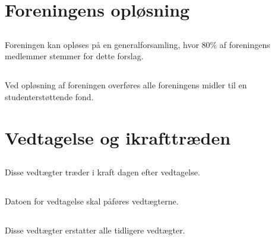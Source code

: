 \documentclass[danish,a4paper,twocolumn,oneside,article]{memoir}
\begin{document}
\chapter{Foreningens opløsning}

\section{} Foreningen kan opløses på en generalforsamling, hvor 80\% af foreningens medlemmer stemmer
for dette forslag.

\section{}\label{s:disbandmentmoney} Ved opløsning af foreningen overføres alle foreningens midler til en studenterstøttende fond.

\chapter{Vedtagelse og ikrafttræden}

\section{} Disse vedtægter træder i kraft dagen efter vedtagelse.

\section{}\label{s:dateonbylaws} Datoen for vedtagelse skal påføres vedtægterne.

\section{} Disse vedtægter erstatter alle tidligere vedtægter.
\end{document}

